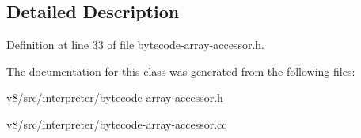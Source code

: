 \subsection{Detailed Description}


Definition at line 33 of file bytecode-\/array-\/accessor.\+h.



The documentation for this class was generated from the following files\+:\begin{DoxyCompactItemize}
\item 
v8/src/interpreter/bytecode-\/array-\/accessor.\+h\item 
v8/src/interpreter/bytecode-\/array-\/accessor.\+cc\end{DoxyCompactItemize}
